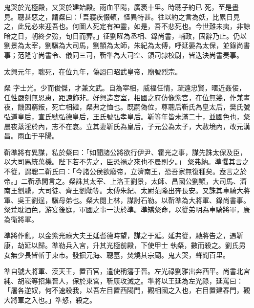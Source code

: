 \begin{pinyinscope}
 鬼哭於光極殿，又哭於建始殿。雨血平陽，廣袤十里。時聰子約已
 死，至是晝見。聰甚惡之，謂粲曰：「吾寢疾惙頓，怪異特甚。往以約之言為妖，比累日見之，此兒必來迎吾也。何圖人死定有神靈，如是，吾不悲死也。今世難未夷，非諒暗之日，朝終夕殮，旬日而葬。」征劉曜為丞相、錄尚書，輔政，固辭乃止。仍以劉景為太宰，劉驥為大司馬，劉顗為太師，朱紀為太傅，呼延晏為太保，並錄尚書事；范隆守尚書令、儀同三司，靳準為大司空、領司隸校尉，皆迭決尚書奏事。



 太興元年，聰死，在位九年，偽謚曰昭武皇帝，廟號烈宗。



 粲
 字士光。少而俊傑，才兼文武。自為宰相，威福任情，疏遠忠賢，暱近姦佞，任性嚴刻無恩惠，距諫飾非。好興造宮室，相國之府仿像紫宮，在位無幾，作兼晝夜，饑困窮叛，死亡相繼，粲弗之恤也。既嗣偽位，尊聰后靳氏為皇太后，樊氏號弘道皇后，宣氏號弘德皇后，王氏號弘孝皇后。靳等年皆未滿二十，並國色也，粲晨夜蒸淫於內，志不在哀。立其妻靳氏為皇后，子元公為太子，大赦境內，改元漢昌。雨血于平陽。



 靳準將有異謀，私於粲曰：「如聞諸公將欲行伊尹、霍光之事，謀先誅太保及臣，以大司馬統萬機。陛下若不先之，臣恐禍之來也不晨則夕。」
 粲弗納。準懼其言之不從，謂聰二靳氏曰：「今諸公侯欲廢帝，立濟南王，恐吾家無復種矣。盍言之於帝。」二靳承間言之。粲誅其太宰、上洛王劉景，太師、昌國公劉顗，大司馬、濟南王劉驥，大司徒、齊王劉勱等。太傅朱紀、太尉范隆出奔長安。又誅其車騎大將軍、吳王劉逞，驥母弟也。粲大閱上林，謀討石勒。以靳準為大將軍、錄尚書事。粲荒耽酒色，游宴後庭，軍國之事一決於準。準矯粲命，以從弟明為車騎將軍，康為衛將軍。



 準將作亂，以金紫光祿大夫王延耆德時望，謀之于延。延弗從，馳將告之，遇靳康，劫延以歸。準勒兵入宮，升其光極前殿，下使甲士
 執粲，數而殺之。劉氏男女無少長皆斬于東市。發掘元海、聰墓，焚燒其宗廟。鬼大哭，聲聞百里。



 準自號大將軍、漢天王，置百官，遣使稱籓于晉。左光祿劉雅出奔西平。尚書北宮純、胡崧等招集晉人，保於東宮，靳康攻滅之。準將以王延為左光祿，延罵曰：「屠各逆奴，何不速殺我，以吾左目置西陽門，觀相國之入也，右目置建春門，觀大將軍之入也。」準怒，殺之。




\end{pinyinscope}
